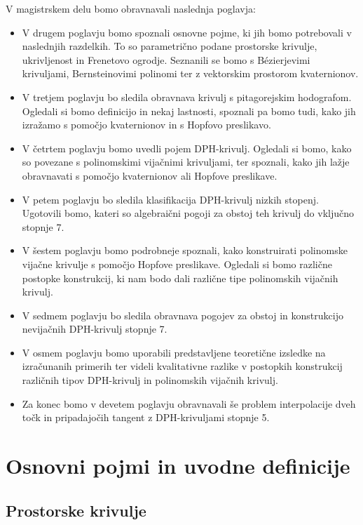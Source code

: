 \documentclass[12pt,a4paper,twoside]{article}
\theoremstyle{definition} %
\theoremstyle{plain} %
\theoremstyle{primerstyle}
\numberwithin{equation}{section}  %
\begin{document}
V magistrskem delu bomo obravnavali naslednja poglavja:
\begin{itemize}
	\item V drugem poglavju bomo spoznali osnovne pojme, ki jih bomo potrebovali v naslednjih razdelkih. To so parametrično podane prostorske krivulje, ukrivljenost in Frenetovo ogrodje. Seznanili se bomo s Bézierjevimi krivuljami, Bernsteinovimi polinomi ter z vektorskim prostorom kvaternionov.
	\item V tretjem poglavju bo sledila obravnava krivulj s pitagorejskim hodografom. Ogledali si bomo definicijo in nekaj lastnosti, spoznali pa bomo tudi, kako jih izražamo s pomočjo kvaternionov in s Hopfovo preslikavo.
	\item V četrtem poglavju bomo uvedli pojem DPH-krivulj. Ogledali si bomo, kako so povezane s polinomskimi vijačnimi krivuljami, ter spoznali, kako jih lažje obravnavati s pomočjo kvaternionov ali Hopfove preslikave.
	\item V petem poglavju bo sledila klasifikacija DPH-krivulj nizkih stopenj. Ugotovili bomo, kateri so algebraični pogoji za obstoj teh krivulj do vključno stopnje 7.
	\item V šestem poglavju bomo podrobneje spoznali, kako konstruirati polinomske vijačne krivulje s pomočjo Hopfove preslikave. Ogledali si bomo različne postopke konstrukcij, ki nam bodo dali različne tipe polinomskih vijačnih krivulj.
	\item V sedmem poglavju bo sledila obravnava pogojev za obstoj in konstrukcijo nevijačnih DPH-krivulj stopnje 7.
	\item V osmem poglavju bomo uporabili predstavljene teoretične izsledke na izračunanih primerih ter videli kvalitativne razlike v postopkih konstrukcij različnih tipov DPH-krivulj in polinomskih vijačnih krivulj.
	\item Za konec bomo v devetem poglavju obravnavali še problem interpolacije dveh točk in pripadajočih tangent z DPH-krivuljami stopnje 5.
\end{itemize}
\clearpage
\section{Osnovni pojmi in uvodne definicije}

\subsection{Prostorske krivulje}
\end{document}
